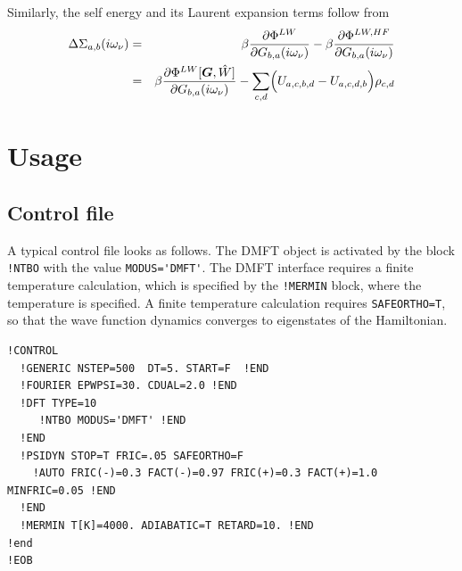 \documentclass[11pt,a4paper]{report}
\begin{document}
Similarly, the self energy and its Laurent expansion terms follow from
\begin{eqnarray}
\Delta\Sigma_{a,b}(i\omega_\nu)&=&
\beta\frac{\partial\Phi^{LW}}{\partial G_{b,a}(i\omega_\nu)}
-\beta\frac{\partial\Phi^{LW,HF}}{\partial G_{b,a}(i\omega_\nu)}
\nonumber\\
&=&\beta\frac{\partial\Phi^{LW}[\bm{G},\hat{W}]}{\partial G_{b,a}(i\omega_\nu)}
-\sum_{c,d}\Bigl(U_{a,c,b,d}-U_{a,c,d,b}\Bigr)\rho_{c,d}
\end{eqnarray}



\section{Usage}
\subsection{Control file}
A typical control file looks as follows. The DMFT object is activated
by the block \verb|!NTBO| with the value \verb|MODUS='DMFT'|. The DMFT
interface requires a finite temperature calculation, which is
specified by the \verb|!MERMIN| block, where the temperature is
specified.  A finite temperature calculation requires
\verb|SAFEORTHO=T|, so that the wave function dynamics converges to
eigenstates of the Hamiltonian.
\begin{verbatim}
!CONTROL
  !GENERIC NSTEP=500  DT=5. START=F  !END 
  !FOURIER EPWPSI=30. CDUAL=2.0 !END
  !DFT TYPE=10  
     !NTBO MODUS='DMFT' !END   
  !END 
  !PSIDYN STOP=T FRIC=.05 SAFEORTHO=F
    !AUTO FRIC(-)=0.3 FACT(-)=0.97 FRIC(+)=0.3 FACT(+)=1.0 MINFRIC=0.05 !END
  !END
  !MERMIN T[K]=4000. ADIABATIC=T RETARD=10. !END
!end
!EOB
\end{verbatim}

\end{document}
